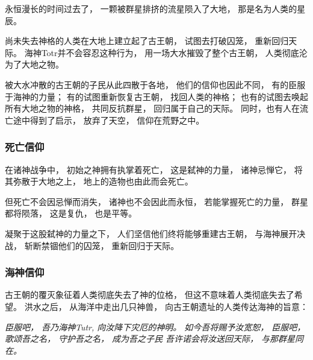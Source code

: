 \documentclass[UTF8,12pt,draft]{ctexbook}
\begin{document}
                永恒漫长的时间过去了，
                一颗被群星排挤的流星陨入了大地，
                那是名为人类的星辰。

                尚未失去神格的人类在大地上建立起了古王朝，
                试图去打破囚笼，
                重新回归天际。
                海神Totr并不会容忍这种行为，
                用一场大水摧毁了整个古王朝，
                人类彻底沦为了大地之物。

                被大水冲散的古王朝的子民从此四散于各地，
                他们的信仰也因此不同，
                有的臣服于海神的力量；
                有的试图重新恢复古王朝，
                找回人类的神格；
                也有的试图去唤起所有大地之物的神格，
                共同反抗群星，
                回归属于自己的天际。
                同时，也有人在流亡途中得到了启示，
                放弃了天空，
                信仰在荒野之中。
                \subsubsection{死亡信仰}
                    在诸神战争中，
                    初始之神拥有执掌着死亡，
                    这是弑神的力量，
                    诸神忌惮它，
                    将其弥散于大地之上，
                    地上的造物也由此而会死亡。

                    但死亡不会因忌惮而消失，
                    诸神也不会因此而永恒，
                    若能掌握死亡的力量，
                    群星都将陨落，
                    这是复仇，
                    也是平等。

                    凝聚于这股弑神的力量之下，
                    人们坚信他们终将能够重建古王朝，
                    与海神展开决战，
                    斩断禁锢他们的囚笼，
                    重新回归于天际。
                \subsubsection{海神信仰}
                    古王朝的覆灭象征着人类彻底失去了神的位格，
                    但这不意味着人类彻底失去了希望。
                    洪水之后，
                    从海洋中走出几只神兽，
                    向古王朝遗址的人类传达海神的旨意：

                    \emph{  臣服吧，
                            吾乃海神Tutr,
                            向汝降下灾厄的神明。
                            如今吾将赐予汝宽恕，
                            臣服吧，
                            歌颂吾之名，
                            守护吾之名，
                            成为吾之子民
                            吾许诺会将汝送回天际，
                            与那群星同在。\\
                            }
\end{document}
